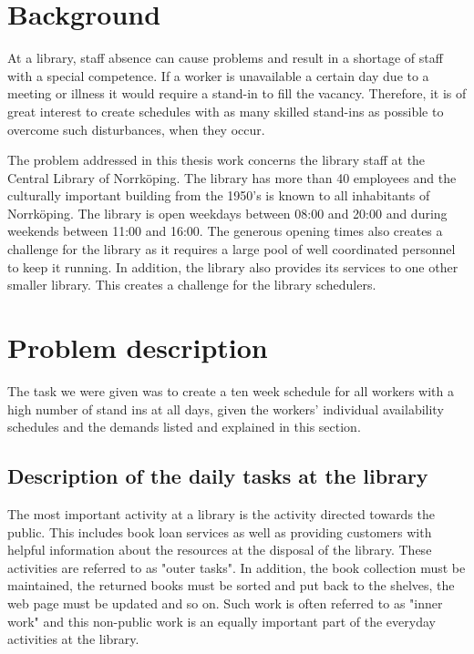 
\section{Background}


At a library, staff absence can cause problems and result in a shortage of staff with a special competence. If a worker is unavailable a certain day due to a meeting or illness it would require a stand-in to fill the vacancy. Therefore, it is of great interest to create schedules with as many skilled stand-ins as possible to overcome such disturbances, when they occur. 

The problem addressed in this thesis work concerns the library staff at the Central Library of Norrköping. The library has more than 40 employees and the culturally important building from the 1950's is known to all inhabitants of Norrköping. The library is open weekdays between 08:00 and 20:00 and during weekends between 11:00 and 16:00. The generous opening times also creates a challenge for the library as it requires a large pool of well coordinated personnel to keep it running. In addition, the library also provides its services to one other smaller library. This creates a challenge for the library schedulers.

\section{Problem description}

The task we were given was to create a ten week schedule for all workers with a high number of stand ins at all days, given the workers' individual availability schedules and the demands listed and explained in this section. 

\subsection{Description of the daily tasks at the library} \label{section:library_tasks}
The most important activity at a library is the activity directed towards the public. This includes book loan services as well as providing customers with helpful information about the resources at the disposal of the library. These activities are referred to as "outer tasks". In addition, the book collection must be maintained, the returned books must be sorted and put back to the shelves, the web page must be updated and so on. Such work is often referred to as "inner work" and this non-public work is an equally important part of the everyday activities at the library. 

